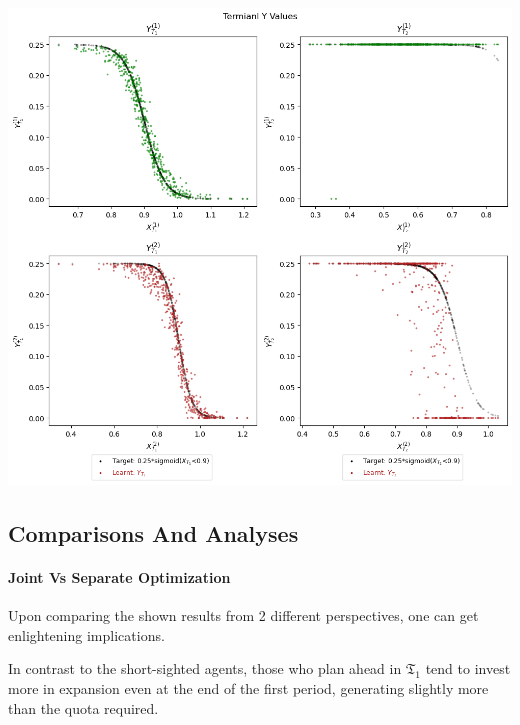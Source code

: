 \documentclass[a4paper,10pt]{article}
\newcommand{\1}{\mathbf{1}}
\begin{document}
\begin{center}
  \begin{minipage}[ht]{0.85\textwidth}
    \centering
    \includegraphics[]{FinalReports/Illustration_diagrams/Seprt-2A2P-Sigmoid-ResExamples/sigmoid_target.png}\\
    \label{fig:terminal-values-sep}
  \end{minipage}
\end{center}


\subsection{Comparisons And Analyses}

\paragraph{Joint Vs Separate Optimization}

Upon comparing the shown results from 2 different perspectives, one can
get enlightening implications.

In contrast to the short-sighted agents, those who plan ahead in \textbf{\(\mathfrak{T}_1\)} tend to invest more in expansion even at the end of the first period, generating slightly more than the quota required.

\end{document}
